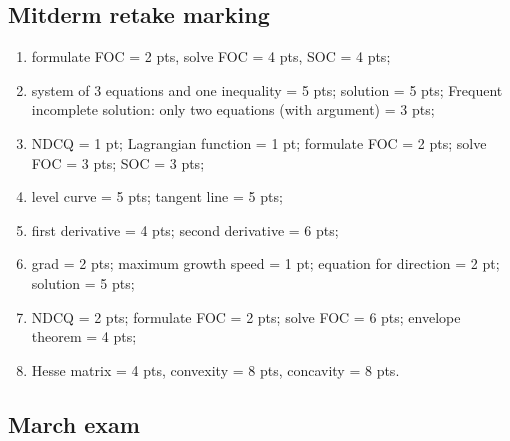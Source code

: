 \subsection{Mitderm retake marking}
\begin{enumerate}
  \item formulate FOC = 2 pts, solve FOC = 4 pts, SOC = 4 pts;
  \item system of 3 equations and one inequality = 5 pts; solution = 5 pts; Frequent incomplete solution: only two equations (with argument) = 3 pts;
  \item NDCQ =  1 pt; Lagrangian function = 1 pt; formulate FOC = 2 pts; solve FOC = 3 pts; SOC = 3 pts;
  \item level curve = 5 pts; tangent line = 5 pts;
  \item first derivative = 4 pts; second derivative = 6 pts;
  \item grad = 2 pts; maximum growth speed = 1 pt; equation for direction = 2 pt; solution = 5 pts;
  \item NDCQ = 2 pts; formulate FOC = 2 pts; solve FOC = 6 pts; envelope theorem = 4 pts;
  \item Hesse matrix = 4 pts, convexity = 8 pts, concavity = 8 pts.
\end{enumerate}


\subsection{March exam}

